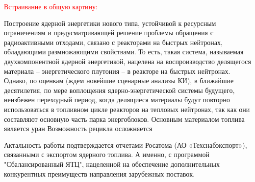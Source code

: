 
{\actuality}

\textcolor{red}{Встраивание в общую картину:}

Построение ядерной энергетики нового типа, устойчивой к ресурсным ограничениям и предусматривающей решение проблемы обращения с радиоактивными отходами, связано с реакторами на быстрых нейтронах, обладающими размножающими свойствами. То есть, такая система, называемая двухкомпонентной ядерной энергетикой, нацелена на воспроизводство делящегося материала -- энергетического  плутония -- в реакторе на быстрых нейтронах. Однако, по оценкам (ждем новейшие сценарные анализы КИ), в ближайшие десятилетия, по мере воплощения ядерно-энергетической системы будущего, неизбежен переходный период, когда делящиеся материалы будут повторно использоваться в топливном цикле реакторов на тепловых нейтронах, так как они составляют основную часть парка энергоблоков. Основным материалом топлива является уран
Возможность рецикла осложняется

Актальность работы подтверждается отчетами Росатома (АО «Техснабэкспорт»), связанными с экспортом ядерного топлива. А  именно, с программой "Сбалансированный ЯТЦ", нацеленной на обеспечение дополнительных конкурентных преимуществ направления зарубежных поставок.


